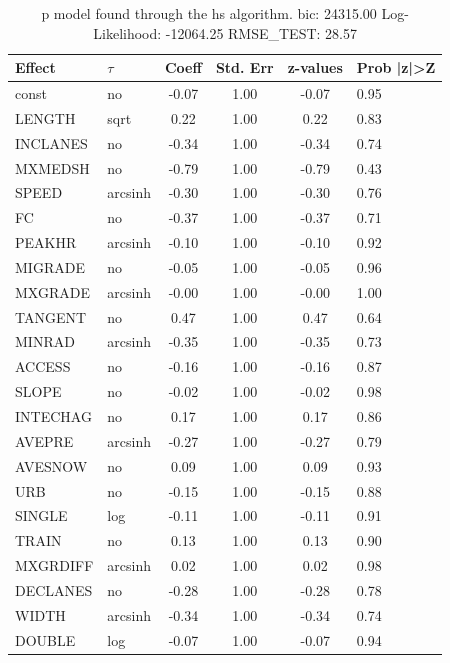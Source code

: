 \begin{table}
	\caption{p model found through the hs algorithm. bic: 24315.00 Log-Likelihood: -12064.25 RMSE_TEST: 28.57}
	\begin{center}
		\begin{tabular}{|l|l|c|c|c|l|}
			\hline
			Effect & $\tau$ & Coeff & Std. Err & z-values & Prob |z|>Z \\
			\hline
			const & no & -0.07 & 1.00 & -0.07 & 0.95 \\
			\hline
			LENGTH & sqrt & 0.22 & 1.00 & 0.22 & 0.83 \\
			\hline
			INCLANES & no & -0.34 & 1.00 & -0.34 & 0.74 \\
			\hline
			MXMEDSH & no & -0.79 & 1.00 & -0.79 & 0.43 \\
			\hline
			SPEED & arcsinh & -0.30 & 1.00 & -0.30 & 0.76 \\
			\hline
			FC & no & -0.37 & 1.00 & -0.37 & 0.71 \\
			\hline
			PEAKHR & arcsinh & -0.10 & 1.00 & -0.10 & 0.92 \\
			\hline
			MIGRADE & no & -0.05 & 1.00 & -0.05 & 0.96 \\
			\hline
			MXGRADE & arcsinh & -0.00 & 1.00 & -0.00 & 1.00 \\
			\hline
			TANGENT & no & 0.47 & 1.00 & 0.47 & 0.64 \\
			\hline
			MINRAD & arcsinh & -0.35 & 1.00 & -0.35 & 0.73 \\
			\hline
			ACCESS & no & -0.16 & 1.00 & -0.16 & 0.87 \\
			\hline
			SLOPE & no & -0.02 & 1.00 & -0.02 & 0.98 \\
			\hline
			INTECHAG & no & 0.17 & 1.00 & 0.17 & 0.86 \\
			\hline
			AVEPRE & arcsinh & -0.27 & 1.00 & -0.27 & 0.79 \\
			\hline
			AVESNOW & no & 0.09 & 1.00 & 0.09 & 0.93 \\
			\hline
			URB & no & -0.15 & 1.00 & -0.15 & 0.88 \\
			\hline
			SINGLE & log & -0.11 & 1.00 & -0.11 & 0.91 \\
			\hline
			TRAIN & no & 0.13 & 1.00 & 0.13 & 0.90 \\
			\hline
			MXGRDIFF & arcsinh & 0.02 & 1.00 & 0.02 & 0.98 \\
			\hline
			DECLANES & no & -0.28 & 1.00 & -0.28 & 0.78 \\
			\hline
			WIDTH & arcsinh & -0.34 & 1.00 & -0.34 & 0.74 \\
			\hline
			DOUBLE & log & -0.07 & 1.00 & -0.07 & 0.94 \\

\end{tabular}
\end{center}
\end{table}
